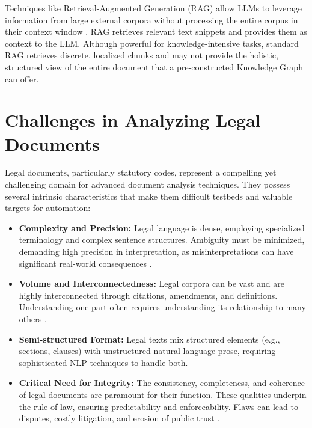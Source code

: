 Techniques like Retrieval-Augmented Generation (RAG) allow LLMs to leverage information from large external corpora without processing the entire corpus in their context window \parencite{RefWorks:RefID:158-lewis2020retrievalaugmented}. RAG retrieves relevant text snippets and provides them as context to the LLM. Although powerful for knowledge-intensive tasks, standard RAG retrieves discrete, localized chunks and may not provide the holistic, structured view of the entire document that a pre-constructed Knowledge Graph can offer.

\section{Challenges in Analyzing Legal Documents} \label{sec:legal_docs}
Legal documents, particularly statutory codes, represent a compelling yet challenging domain for advanced document analysis techniques. They possess several intrinsic characteristics that make them difficult testbeds and valuable targets for automation:
\begin{itemize}
    \item \textbf{Complexity and Precision:} Legal language is dense, employing specialized terminology and complex sentence structures. Ambiguity must be minimized, demanding high precision in interpretation, as misinterpretations can have significant real-world consequences \parencite{RefWorks:RefID:159-ashley2017artificial, RefWorks:RefID:62-malik2022semantic}.
    \item \textbf{Volume and Interconnectedness:} Legal corpora can be vast and are highly interconnected through citations, amendments, and definitions. Understanding one part often requires understanding its relationship to many others \parencite{RefWorks:RefID:68-beth2018bills}.
    \item \textbf{Semi-structured Format:} Legal texts mix structured elements (e.g., sections, clauses) with unstructured natural language prose, requiring sophisticated NLP techniques to handle both.
    \item \textbf{Critical Need for Integrity:} The consistency, completeness, and coherence of legal documents are paramount for their function. These qualities underpin the rule of law, ensuring predictability and enforceability. Flaws can lead to disputes, costly litigation, and erosion of public trust \parencite{RefWorks:RefID:52-donelson2019legal, RefWorks:RefID:53-duck-mayr2022explaining, RefWorks:RefID:54-rossi2016inconsistent}.
\end{itemize}

